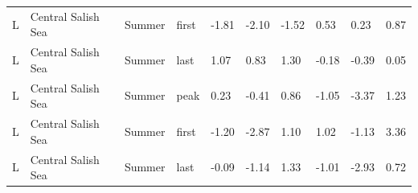 \documentclass{article}
\begin{document}
\begin{table}[ht]
\begin{tabular}{|p{}|p{}|p{}|p{}|p{}p{}p{}|p{}p{}p{}|}
  L & Central Salish Sea & Summer & first & -1.81 & -2.10 & -1.52 & 0.53 & 0.23 & 0.87 \\ 
  L & Central Salish Sea & Summer & last & 1.07 & 0.83 & 1.30 & -0.18 & -0.39 & 0.05 \\ 
  L & Central Salish Sea & Summer & peak & 0.23 & -0.41 & 0.86 & -1.05 & -3.37 & 1.23 \\ 
  L & Central Salish Sea & Summer & first & -1.20 & -2.87 & 1.10 & 1.02 & -1.13 & 3.36 \\ 
  L & Central Salish Sea & Summer & last & -0.09 & -1.14 & 1.33 & -1.01 & -2.93 & 0.72 \\ 
   \hline
\end{tabular}
\endgroup
\end{table}
  
\end{document}
